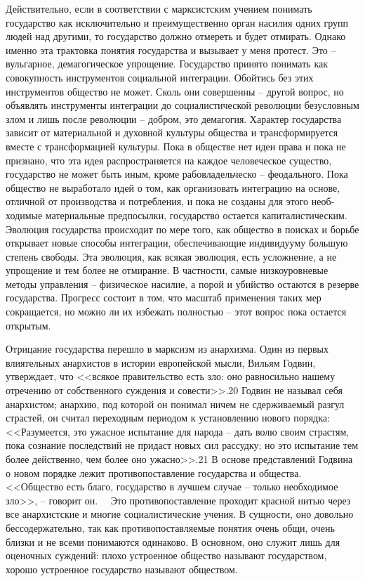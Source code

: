 \documentclass{book}
\begin{document}
Действительно, если в соответствии с марксистским учением понимать государство как исключительно и преимущественно орган насилия одних групп людей над другими, то государство должно отмереть и будет отмирать. Однако именно эта трак­товка понятия государства и вызывает у меня протест. Это -- вульгарное, демагогическое упрощение. Государство принято понимать как совокупность инструментов социальной интег­рации. Обойтись без этих инструментов общество не может. Сколь они совершенны -- другой вопрос, но объявлять инстру­менты интеграции до социалистической революции безуслов­ным злом и лишь после революции -- добром, это демагогия.
Характер государства зависит от материальной и духовной культуры общества и трансформируется вместе с трансфор­мацией культуры. Пока в обществе нет идеи права и пока не признано, что эта идея распространяется на каждое человече­ское существо, государство не может быть иным, кроме рабовладельческо -- феодального. Пока общество не выработало идей о том, как организовать интеграцию на основе, отличной от производства и потребления, и пока не созданы для этого необ­ходимые материальные предпосылки, государство остается капиталистическим. Эволюция государства происходит по ме­ре того, как общество в поисках и борьбе открывает новые способы интеграции, обеспечивающие индивидууму большую степень свободы. Эта эволюция, как всякая эволюция, есть усложнение,  а не упрощение и тем более не отмирание. В част­ности, самые низкоуровневые методы управления -- физическое насилие, а порой и убийство остаются в резерве государства. Прогресс состоит в том, что масштаб применения таких мер сокращается, но можно ли их избежать 
полностью -- этот вопрос пока остается открытым.

Отрицание государства перешло в марксизм из анархизма. Один из первых влиятельных анархистов в истории европей­ской мысли, Вильям Годвин, утверждает, что <<всякое правительство есть зло: оно равносильно нашему отречению от соб­ственного суждения и совести>>.20 Годвин не называл себя анархистом; анархию, под которой он понимал ничем не сдер­живаемый разгул страстей, он считал переходным периодом к установлению нового порядка: <<Разумеется, это ужасное испытание для народа -- дать волю своим страстям, пока со­знание последствий не придаст новых сил рассудку; но это ис­пытание тем более действенно, чем более оно ужасно>>.21
В основе представлений Годвина о новом порядке лежит противопоставление государства и общества. <<Общество есть благо, государство в лучшем случае -- только необходимое зло>>, -- говорит он.   Это противопоставление проходит крас­ной нитью через все анархистские и многие социалистические учения. В сущности, оно довольно бессодержательно, так как противопоставляемые понятия очень общи, очень близки и не всеми понимаются одинаково. В основном, оно служит лишь для оценочных суждений: плохо устроенное общество называют государством, хорошо устроенное государство называют об­ществом.
\end{document}
